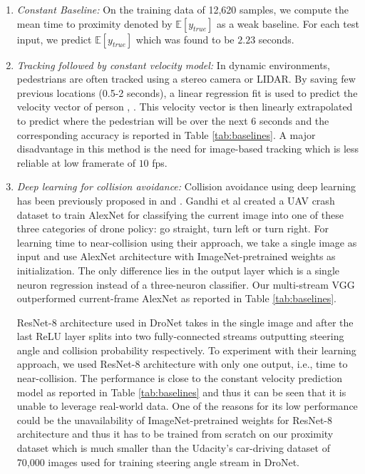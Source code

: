 \begin{enumerate}
    \item \textit{Constant Baseline:} On the training data of 12,620 samples, we compute the mean time to proximity denoted by $\mathbb{E}[y_{true}]$ as a weak baseline. For each test input, we predict $\mathbb{E}[y_{true}]$ which was found to be $2.23$ seconds. 
    
    \item \textit{Tracking followed by constant velocity model:} In dynamic environments, pedestrians are often tracked using a stereo camera or LIDAR. By saving few previous locations (0.5-2 seconds), a linear regression fit is used to predict the velocity vector of person \cite{BBeep}, \cite{SIPP}. This velocity vector is then linearly extrapolated to predict where the pedestrian will be over the next 6 seconds and the corresponding accuracy is reported in Table \ref{tab:baselines}. A major disadvantage in this method is the need for image-based tracking which is less reliable at low framerate of $10$ fps.     
    \item \textit{Deep learning for collision avoidance:} Collision avoidance using deep learning has been previously proposed in \cite{gandhi} and \cite{DroNet}. Gandhi et al \cite{gandhi} created a UAV crash dataset to train AlexNet for classifying the current image into one of these three categories of drone policy: go straight, turn left or turn right. For learning time to near-collision using their approach, we take a single image as input and use AlexNet architecture with ImageNet-pretrained weights as initialization. The only difference lies in the output layer which is a single neuron regression instead of a three-neuron classifier. Our multi-stream VGG outperformed current-frame AlexNet as reported in Table \ref{tab:baselines}.
    
ResNet-8 architecture used in DroNet \cite{DroNet} takes in the single image and after the last ReLU layer splits into two fully-connected streams outputting steering angle and collision probability respectively. To experiment with their learning approach, we used ResNet-8 architecture with only one output, i.e., time to near-collision. The performance is close to the constant velocity prediction model as reported in Table \ref{tab:baselines} and thus it can be seen that it is unable to leverage real-world data. One of the reasons for its low performance could be the unavailability of ImageNet-pretrained weights for ResNet-8 architecture and thus it has to be trained from scratch on our proximity dataset which is much smaller than the Udacity's car-driving dataset of 70,000 images used for training steering angle stream in DroNet.   
    

\end{enumerate}
